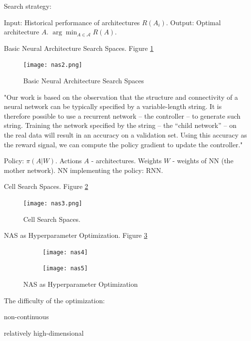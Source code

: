 \documentclass[english]{article}
\begin{document}
Search strategy: 

Input: Historical performance of architectures $R(A_i)$. Output: Optimal architecture $A$.  $\arg\min_{A\in\mathcal{A}} R(A)$.





\item Basic Neural Architecture Search Spaces. Figure \ref{nas2}  
\begin{figure}[h!]
  \centering
  \texttt{[image: nas2.png]}
  \caption{Basic Neural Architecture Search Spaces}
  \label{nas2}
\end{figure}

"Our work is based on the observation that the structure and connectivity of a neural network can be typically specified by a variable-length string. It is therefore possible to use
a recurrent network – the controller – to generate such string. Training the network specified by the
string – the “child network” – on the real data will result in an accuracy on a validation set. Using
this accuracy as the reward signal, we can compute the policy gradient to update the controller."


Policy: $\pi(A|W)$. Actions $A$ - architectures. Weights $W$ - weights of NN (the mother network). NN implementing the policy: RNN.


\item Cell Search Spaces. Figure \ref{nas3}  


\begin{figure}[h!]
  \centering
  \texttt{[image: nas3.png]}
  \caption{Cell Search Spaces.}
  \label{nas3}
\end{figure}

\item NAS as Hyperparameter Optimization. Figure \ref{nas4}  


\begin{figure}[h!]
\centering
\begin{subfigure}{.5\textwidth}
  \centering
  \texttt{[image: nas4]}
\end{subfigure}%
\begin{subfigure}{.5\textwidth}
  \centering
  \texttt{[image: nas5]}
\end{subfigure}
\caption{NAS as Hyperparameter Optimization}
  \label{nas4}
\end{figure}


\item The difficulty of the optimization:

\benum 
\item non-continuous
\item relatively high-dimensional
\eenum 
\end{document}
